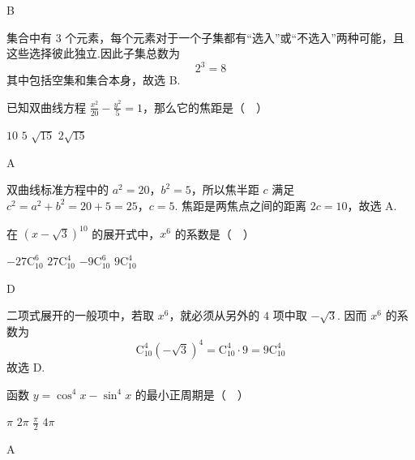 \documentclass[UTF8,a4paper,oneside,11pt]{ctexbook}
\begin{document}
\begin{answer}
B
\end{answer}

\begin{solution}
集合中有 \(3\) 个元素，每个元素对于一个子集都有“选入”或“不选入”两种可能，且这些选择彼此独立.因此子集总数为
\[
2^3=8
\]
其中包括空集和集合本身，故选 B.
\end{solution}

\begin{problem}

已知双曲线方程 \(\frac{x^2}{20} - \frac{y^2}{5} = 1\)，那么它的焦距是（\(\quad\)）

\choices
    {\(10\)}
    {\(5\)}
    {\(\sqrt{15}\)}
    {\(2\sqrt{15}\)}
\end{problem}

\begin{answer}
A
\end{answer}

\begin{solution}
双曲线标准方程中的 \(a^2=20\)，\(b^2=5\)，所以焦半距 \(c\) 满足
\(c^2=a^2+b^2=20+5=25\)，\(c=5\).
焦距是两焦点之间的距离 \(2c=10\)，故选 A.
\end{solution}

\begin{problem}

在 \((x - \sqrt{3})^10\) 的展开式中，\(x^6\) 的系数是（\(\quad\)）

\choices
    {\(-27\mathrm C_{10}^6\)}
    {\(27\mathrm C_{10}^4\)}
    {\(-9\mathrm C_{10}^6\)}
    {\(9\mathrm C_{10}^4\)}
\end{problem}

\begin{answer}
D
\end{answer}

\begin{solution}
二项式展开的一般项中，若取 \(x^6\)，就必须从另外的 \(4\) 项中取 \(-\sqrt{3}\). 因而 \(x^6\) 的系数为
\[
\mathrm C_{10}^{4}(-\sqrt{3})^4=\mathrm C_{10}^{4}\cdot9=9\mathrm C_{10}^{4}
\]
故选 D.
\end{solution}

\begin{problem}

函数 \(y=\cos^4 x-\sin^4 x\) 的最小正周期是（\(\quad\)）

\choices
    {\(\pi\)}
    {\(2\pi\)}
    {\(\frac{\pi}{2}\)}
    {\(4\pi\)}
\end{problem}

\begin{answer}
A
\end{answer}
\end{document}

